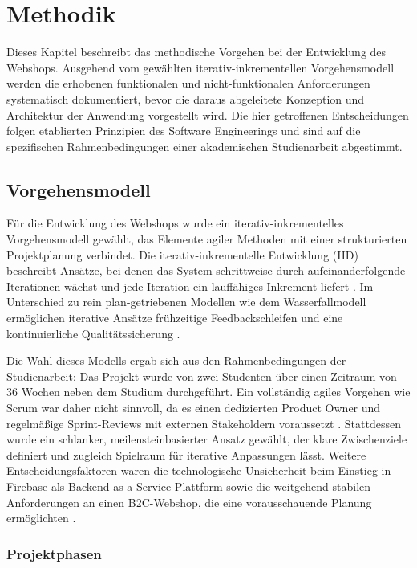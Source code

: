 \chapter{Methodik}
\label{ch:methodik}

Dieses Kapitel beschreibt das methodische Vorgehen bei der Entwicklung des Webshops. Ausgehend vom gewählten iterativ-inkrementellen Vorgehensmodell werden die erhobenen funktionalen und nicht-funktionalen Anforderungen systematisch dokumentiert, bevor die daraus abgeleitete Konzeption und Architektur der Anwendung vorgestellt wird. Die hier getroffenen Entscheidungen folgen etablierten Prinzipien des Software Engineerings und sind auf die spezifischen Rahmenbedingungen einer akademischen Studienarbeit abgestimmt.

\section{Vorgehensmodell}
\label{sec:vorgehensmodell}

Für die Entwicklung des Webshops wurde ein iterativ-inkrementelles Vorgehensmodell gewählt, das Elemente agiler Methoden mit einer strukturierten Projektplanung verbindet. Die iterativ-inkrementelle Entwicklung (IID) beschreibt Ansätze, bei denen das System schrittweise durch aufeinanderfolgende Iterationen wächst und jede Iteration ein lauffähiges Inkrement liefert \cite{larman2003}. Im Unterschied zu rein plan-getriebenen Modellen wie dem Wasserfallmodell ermöglichen iterative Ansätze frühzeitige Feedbackschleifen und eine kontinuierliche Qualitätssicherung \cite{yadav2015}.

Die Wahl dieses Modells ergab sich aus den Rahmenbedingungen der Studienarbeit: Das Projekt wurde von zwei Studenten über einen Zeitraum von 36 Wochen neben dem Studium durchgeführt. Ein vollständig agiles Vorgehen wie Scrum war daher nicht sinnvoll, da es einen dedizierten Product Owner und regelmäßige Sprint-Reviews mit externen Stakeholdern voraussetzt \cite{yadav2015}. Stattdessen wurde ein schlanker, meilensteinbasierter Ansatz gewählt, der klare Zwischenziele definiert und zugleich Spielraum für iterative Anpassungen lässt. Weitere Entscheidungsfaktoren waren die technologische Unsicherheit beim Einstieg in Firebase als Backend-as-a-Service-Plattform \cite{uunonen2023} sowie die weitgehend stabilen Anforderungen an einen B2C-Webshop, die eine vorausschauende Planung ermöglichten \cite{heinemann2024}.

\subsection{Projektphasen}
\label{subsec:projektphasen}

